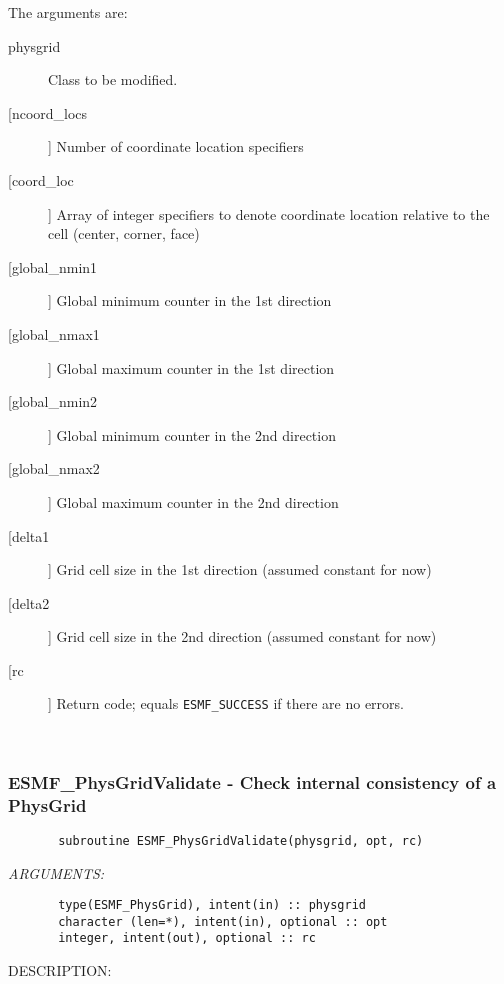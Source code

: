        The arguments are:
       \begin{description}
       \item[physgrid]
            Class to be modified.
       \item[[ncoord\_locs]]
            Number of coordinate location specifiers
       \item[[coord\_loc]]
            Array of integer specifiers to denote coordinate location relative
            to the cell (center, corner, face)
       \item[[global\_nmin1]]
            Global minimum counter in the 1st direction
       \item[[global\_nmax1]]
            Global maximum counter in the 1st direction
       \item[[global\_nmin2]]
            Global minimum counter in the 2nd direction
       \item[[global\_nmax2]]
            Global maximum counter in the 2nd direction
       \item[[delta1]]
            Grid cell size in the 1st direction (assumed constant for now)
       \item[[delta2]]
            Grid cell size in the 2nd direction (assumed constant for now)
       \item[[rc]]
            Return code; equals {\tt ESMF\_SUCCESS} if there are no errors.
       \end{description}
   
 
\mbox{}\hrulefill\ 
 
\subsubsection{ESMF\_PhysGridValidate - Check internal consistency of a PhysGrid}


 
\begin{verbatim}       subroutine ESMF_PhysGridValidate(physgrid, opt, rc)\end{verbatim}{\em ARGUMENTS:}
\begin{verbatim}       type(ESMF_PhysGrid), intent(in) :: physgrid       
       character (len=*), intent(in), optional :: opt    
       integer, intent(out), optional :: rc            \end{verbatim}
{\sf DESCRIPTION:\\ }


